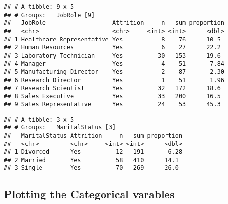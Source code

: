 \documentclass[
]{article}
\newenvironment{Shaded}{\begin{snugshade}}{\end{snugshade}}
\newcommand{\DataTypeTok}[1]{\textcolor[rgb]{0.13,0.29,0.53}{#1}}
\newcommand{\DecValTok}[1]{\textcolor[rgb]{0.00,0.00,0.81}{#1}}
\newcommand{\KeywordTok}[1]{\textcolor[rgb]{0.13,0.29,0.53}{\textbf{#1}}}
\newcommand{\NormalTok}[1]{#1}
\newcommand{\OperatorTok}[1]{\textcolor[rgb]{0.81,0.36,0.00}{\textbf{#1}}}
\newcommand{\StringTok}[1]{\textcolor[rgb]{0.31,0.60,0.02}{#1}}
\begin{document}
\begin{verbatim}
## # A tibble: 9 x 5
## # Groups:   JobRole [9]
##   JobRole                   Attrition     n   sum proportion
##   <chr>                     <chr>     <int> <int>      <dbl>
## 1 Healthcare Representative Yes           8    76      10.5 
## 2 Human Resources           Yes           6    27      22.2 
## 3 Laboratory Technician     Yes          30   153      19.6 
## 4 Manager                   Yes           4    51       7.84
## 5 Manufacturing Director    Yes           2    87       2.30
## 6 Research Director         Yes           1    51       1.96
## 7 Research Scientist        Yes          32   172      18.6 
## 8 Sales Executive           Yes          33   200      16.5 
## 9 Sales Representative      Yes          24    53      45.3
\end{verbatim}

\begin{Shaded}
\end{Shaded}

\begin{verbatim}
## # A tibble: 3 x 5
## # Groups:   MaritalStatus [3]
##   MaritalStatus Attrition     n   sum proportion
##   <chr>         <chr>     <int> <int>      <dbl>
## 1 Divorced      Yes          12   191       6.28
## 2 Married       Yes          58   410      14.1 
## 3 Single        Yes          70   269      26.0
\end{verbatim}

\hypertarget{plotting-the-categorical-varables}{%
\subsection{Plotting the Categorical
varables}\label{plotting-the-categorical-varables}}
\end{document}
